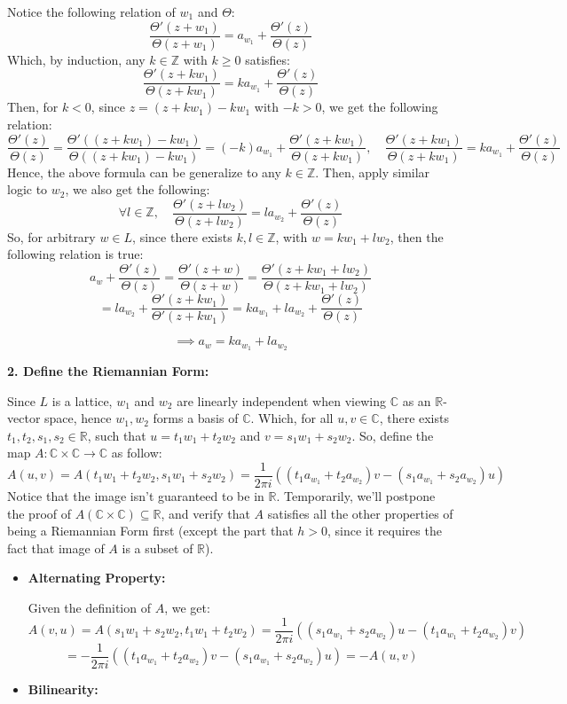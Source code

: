 \documentclass{article}
\begin{document}
\begin{itemize}
    Notice the following relation of $w_1$ and $\Theta$:
    $$\frac{\Theta'(z+w_1)}{\Theta(z+w_1)}=a_{w_1}+\frac{\Theta'(z)}{\Theta(z)}$$
    Which, by induction, any $k\in\mathbb{Z}$ with $k\geq 0$ satisfies:
    $$\frac{\Theta'(z+kw_1)}{\Theta(z+kw_1)}=ka_{w_1}+\frac{\Theta'(z)}{\Theta(z)}$$
    Then, for $k<0$, since $z=(z+kw_1)-kw_1$ with $-k>0$, we get the following relation:
    $$\frac{\Theta'(z)}{\Theta(z)}=\frac{\Theta'((z+kw_1)-kw_1)}{\Theta((z+kw_1)-kw_1)} = (-k)a_{w_1}+\frac{\Theta'(z+kw_1)}{\Theta(z+kw_1)},\quad \frac{\Theta'(z+kw_1)}{\Theta(z+kw_1)} = ka_{w_1}+\frac{\Theta'(z)}{\Theta(z)}$$
    Hence, the above formula can be generalize to any $k\in\mathbb{Z}$. Then, apply similar logic to $w_2$, we also get the following:
    $$\forall l\in\mathbb{Z},\quad \frac{\Theta'(z+lw_2)}{\Theta(z+lw_2)} = la_{w_2}+\frac{\Theta'(z)}{\Theta(z)}$$
    So, for arbitrary $w\in L$, since there exists $k,l\in\mathbb{Z}$, with $w=kw_1+lw_2$, then the following relation is true:
    $$a_w+\frac{\Theta'(z)}{\Theta(z)}=\frac{\Theta'(z+w)}{\Theta(z+w)} = \frac{\Theta'(z+kw_1+lw_2)}{\Theta(z+kw_1+lw_2)}$$
    $$ = la_{w_2}+\frac{\Theta'(z+kw_1)}{\Theta'(z+kw_1)} = ka_{w_1}+la_{w_2}+\frac{\Theta'(z)}{\Theta(z)}$$
    
    $$\implies a_w = ka_{w_1}+la_{w_2}$$

    \hfil

    \textbf{2. Define the Riemannian Form:}

    Since $L$ is a lattice, $w_1$ and $w_2$ are linearly independent when viewing $\mathbb{C}$ as an $\mathbb{R}$-vector space, hence $w_1,w_2$ forms a basis of $\mathbb{C}$. Which, for all $u,v\in\mathbb{C}$, there exists $t_1,t_2,s_1,s_2\in\mathbb{R}$, such that $u=t_1w_1+t_2w_2$ and $v=s_1w_1+s_2w_2$. So, define the map $A:\mathbb{C}\times\mathbb{C}\rightarrow\mathbb{C}$ as follow:
    $$A(u,v) = A(t_1w_1+t_2w_2,s_1w_1+s_2w_2) = \frac{1}{2\pi i}((t_1a_{w_1}+t_2a_{w_2})v - (s_1a_{w_1}+s_2a_{w_2})u)$$
    Notice that the image isn't guaranteed to be in $\mathbb{R}$. Temporarily, we'll postpone the proof of $A(\mathbb{C}\times \mathbb{C})\subseteq \mathbb{R}$, and verify that $A$ satisfies all the other properties of being a Riemannian Form first (except the part that $h>0$, since it requires the fact that image of $A$ is a subset of $\mathbb{R}$).
    \begin{itemize}
        \item \textbf{Alternating Property:}
        
        Given the definition of $A$, we get:
        $$A(v,u)=A(s_1w_1+s_2w_2,t_1w_1+t_2w_2) = \frac{1}{2\pi i}((s_1a_{w_1}+s_2a_{w_2})u-(t_1a_{w_1}+t_2a_{w_2})v)$$
        $$ = -\frac{1}{2\pi i}((t_1a_{w_1}+t_2a_{w_2})v-(s_1a_{w_1}+s_2a_{w_2})u) = -A(u,v)$$
        \item \textbf{Bilinearity:}
        

\end{itemize}
\end{itemize}
\end{document}
